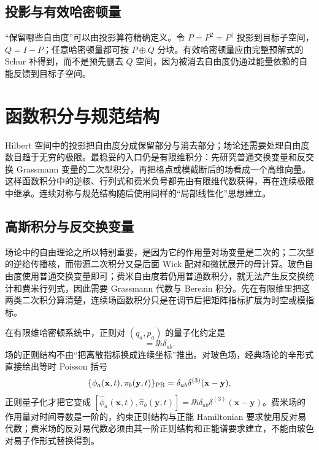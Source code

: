 

\subsection{投影与有效哈密顿量}
“保留哪些自由度”可以由投影算符精确定义。令 $P=P^2=P^\dagger$ 投影到目标子空间，$Q=I-P$；任意哈密顿量都可按 $P\oplus Q$ 分块。有效哈密顿量应由完整预解式的 Schur 补得到，而不是预先删去 $Q$ 空间，因为被消去自由度仍通过能量依赖的自能反馈到目标子空间。





\section{函数积分与规范结构}

Hilbert 空间中的投影把自由度分成保留部分与消去部分；场论还需要处理自由度数目趋于无穷的极限。最稳妥的入口仍是有限维积分：先研究普通交换变量和反交换 Grassmann 变量的二次型积分，再把格点或模截断后的场看成一个高维向量。这样函数积分中的逆核、行列式和费米负号都先由有限维代数获得，再在连续极限中继承。连续对称与规范结构随后使用同样的“局部线性化”思想建立。

\subsection{高斯积分与反交换变量}
场论中的自由理论之所以特别重要，是因为它的作用量对场变量是二次的；二次型的逆给传播核，而带源二次积分又是后面 Wick 配对和微扰展开的母计算。玻色自由度使用普通交换变量即可；费米自由度若仍用普通数积分，就无法产生反交换统计和费米行列式，因此需要 Grassmann 代数与 Berezin 积分。先在有限维里把这两类二次积分算清楚，连续场函数积分只是在调节后把矩阵指标扩展为时空或模指标。

在有限维哈密顿系统中，正则对 $(q_a,p_a)$ 的量子化约定是
\begin{equation}
[\hat q_a,\hat p_b]=\ii\hbar\delta_{ab}.
\label{eq:global-canonical-quantization}
\end{equation}
场的正则结构不由“把离散指标换成连续坐标”推出。对玻色场，经典场论的辛形式直接给出等时 Poisson 括号
\[
 \{\phi_a(\mathbf x,t),\pi_b(\mathbf y,t)\}_{\rm PB}
 =\delta_{ab}\delta^{(3)}(\mathbf x-\mathbf y),
\]
正则量子化才把它变成 $[\hat\phi_a(\mathbf x,t),\hat\pi_b(\mathbf y,t)]=\ii\hbar\delta_{ab}\delta^{(3)}(\mathbf x-\mathbf y)$。费米场的作用量对时间导数是一阶的，约束正则结构与正能 Hamiltonian 要求使用反对易代数；费米场的反对易代数必须由其一阶正则结构和正能谱要求建立，不能由玻色对易子作形式替换得到。

